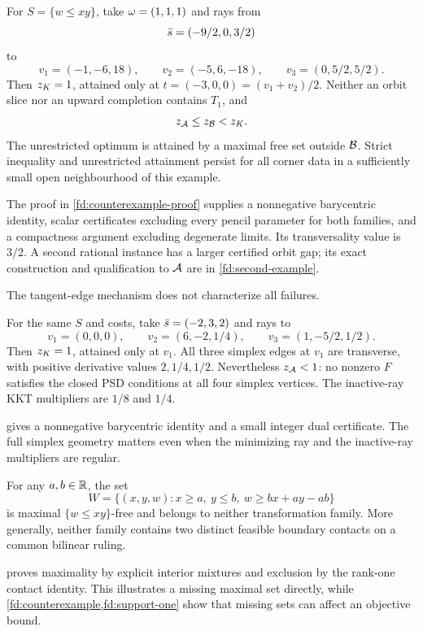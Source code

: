\begin{theorem}
\label{fd:counterexample}
For $S=\{w\le xy\}$, take $\omega=(1,1,1)$ and rays from
\[
 \bar s=(-9/2,0,3/2)
\]
to
\[
 v_1=(-1,-6,18),\qquad v_2=(-5,6,-18),\qquad v_3=(0,5/2,5/2).
\]
Then $z_K=1$, attained only at
$t=(-3,0,0)=(v_1+v_2)/2$. Neither an orbit slice nor an upward completion
contains $T_1$, and
\[
 z_{\mathcal A}\le z_{\mathcal B}<z_K.
\]
The unrestricted optimum is attained by a maximal free set outside
$\mathcal B$. Strict inequality and unrestricted attainment persist for all
corner data in a sufficiently small open neighbourhood of this example.
\end{theorem}
The proof in \cref{fd:counterexample-proof} supplies a nonnegative
barycentric identity, scalar certificates excluding every pencil
parameter for both families, and a compactness argument excluding
degenerate limits. Its transversality value is $3/2$.
A second rational instance has a larger certified orbit gap; its exact
construction and qualification to $\mathcal A$ are in \cref{fd:second-example}.

The tangent-edge mechanism does not characterize all failures.
\begin{proposition}
\label{fd:support-one}
For the same $S$ and costs, take $\bar s=(-2,3,2)$ and rays to
\[
 v_1=(0,0,0),\qquad v_2=(6,-2,1/4),\qquad v_3=(1,-5/2,1/2).
\]
Then $z_K=1$, attained only at $v_1$. All three simplex edges at $v_1$
are transverse, with positive derivative values $2,1/4,1/2$.
Nevertheless $z_{\mathcal A}<1$: no nonzero $F$ satisfies the closed PSD conditions
at all four simplex vertices. The inactive-ray KKT multipliers are
$1/8$ and $1/4$.
\end{proposition}
 gives a nonnegative barycentric identity
and a small integer dual certificate. The full simplex geometry matters
even when the minimizing ray and the inactive-ray multipliers are regular.

\begin{proposition}
\label{fd:wedge}
For any $a,b\in\mathbb R$, the set
\[
 W=\{(x,y,w):x\ge a,\ y\le b,\ w\ge bx+ay-ab\}
\]
is maximal $\{w\le xy\}$-free and belongs to neither transformation
family. More generally, neither family contains two distinct feasible
boundary contacts on a common bilinear ruling.
\end{proposition}
 proves maximality by explicit interior mixtures
and exclusion by the rank-one contact identity. This illustrates a
missing maximal set directly, while \cref{fd:counterexample,fd:support-one}
show that missing sets can affect an objective bound.
